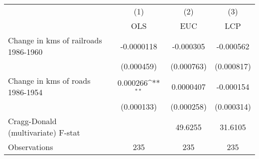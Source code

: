 {
\def\sym#1{\ifmmode^{#1}\else\(^{#1}\)\fi}
\begin{tabular}{l*{3}{c}}
\hline\hline
                &\multicolumn{1}{c}{(1)}&\multicolumn{1}{c}{(2)}&\multicolumn{1}{c}{(3)}\\
                &\multicolumn{1}{c}{OLS}&\multicolumn{1}{c}{EUC}&\multicolumn{1}{c}{LCP}\\
\hline
Change in kms of railroads 1986-1960&-0.0000118         &-0.000305         &-0.000562         \\
                &(0.000459)         &(0.000763)         &(0.000817)         \\
[1em]
Change in kms of roads 1986-1954& 0.000266\sym{**} &0.0000407         &-0.000154         \\
                &(0.000133)         &(0.000258)         &(0.000314)         \\
\hline
Cragg-Donald (multivariate) F-stat&                  &  49.6255         &  31.6105         \\
Observations    &      235         &      235         &      235         \\
\hline\hline
\end{tabular}
}
